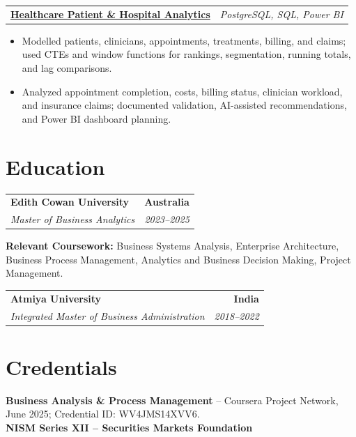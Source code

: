 \documentclass[letterpaper,10pt]{article}
\makeatletter
\newcommand{\role}[4]{%
  \begin{tabularx}{\textwidth}{@{}Xr@{}}
    \textbf{#1} & \textbf{#2} \\
    \textit{#3} & \textit{#4}
  \end{tabularx}\vspace{-1pt}
}
\newcommand{\project}[2]{%
  \begin{tabularx}{\textwidth}{@{}Xr@{}}
    \textbf{#1} & \textit{#2}
  \end{tabularx}\vspace{-1pt}
}
\makeatother
\begin{document}
\project{\href{https://github.com/jainalimehta/Healthcare-Analytics}{Healthcare Patient \& Hospital Analytics}}{PostgreSQL, SQL, Power BI}
\begin{itemize}
  \item Modelled patients, clinicians, appointments, treatments, billing, and claims; used CTEs and window functions for rankings, segmentation, running totals, and lag comparisons.
  \item Analyzed appointment completion, costs, billing status, clinician workload, and insurance claims; documented validation, AI-assisted recommendations, and Power BI dashboard planning.
\end{itemize}

\section{Education}
\role{Edith Cowan University}{Australia}{Master of Business Analytics}{2023--2025}
\textbf{Relevant Coursework:} Business Systems Analysis, Enterprise Architecture, Business Process Management, Analytics and Business Decision Making, Project Management.\\[2pt]
\role{Atmiya University}{India}{Integrated Master of Business Administration}{2018--2022}

\section{Credentials}
\textbf{Business Analysis \& Process Management} -- Coursera Project Network, June 2025; Credential ID: WV4JMS14XVV6.\\[-0.2pt]
\textbf{NISM Series XII -- Securities Markets Foundation}
\end{document}
